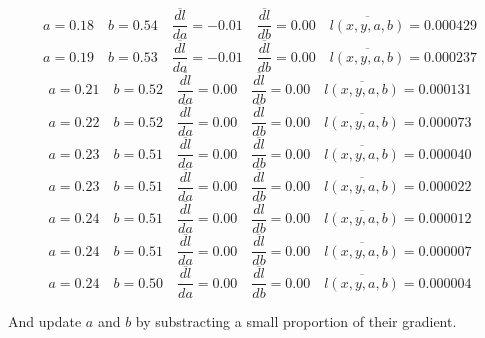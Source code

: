 \documentclass[9pt]{beamer}
\begin{document}
\begin{frame}
\begin{overprint}
     \[ a = 0.18 \quad b = 0.54 \quad \overline{\frac{dl}{da}} = -0.01 \quad \overline{\frac{dl}{db}} = 0.00 \quad \overline{l(x, y, a, b)} = 0.000429 \]
     \[ a = 0.19 \quad b = 0.53 \quad \overline{\frac{dl}{da}} = -0.01 \quad \overline{\frac{dl}{db}} = 0.00 \quad \overline{l(x, y, a, b)} = 0.000237 \]
     \[ a = 0.21 \quad b = 0.52 \quad \overline{\frac{dl}{da}} = 0.00 \quad \overline{\frac{dl}{db}} = 0.00 \quad \overline{l(x, y, a, b)} = 0.000131 \]
     \[ a = 0.22 \quad b = 0.52 \quad \overline{\frac{dl}{da}} = 0.00 \quad \overline{\frac{dl}{db}} = 0.00 \quad \overline{l(x, y, a, b)} = 0.000073 \]
     \[ a = 0.23 \quad b = 0.51 \quad \overline{\frac{dl}{da}} = 0.00 \quad \overline{\frac{dl}{db}} = 0.00 \quad \overline{l(x, y, a, b)} = 0.000040 \]
     \[ a = 0.23 \quad b = 0.51 \quad \overline{\frac{dl}{da}} = 0.00 \quad \overline{\frac{dl}{db}} = 0.00 \quad \overline{l(x, y, a, b)} = 0.000022 \]
     \[ a = 0.24 \quad b = 0.51 \quad \overline{\frac{dl}{da}} = 0.00 \quad \overline{\frac{dl}{db}} = 0.00 \quad \overline{l(x, y, a, b)} = 0.000012 \]
     \[ a = 0.24 \quad b = 0.51 \quad \overline{\frac{dl}{da}} = 0.00 \quad \overline{\frac{dl}{db}} = 0.00 \quad \overline{l(x, y, a, b)} = 0.000007 \]
     \[ a = 0.24 \quad b = 0.50 \quad \overline{\frac{dl}{da}} = 0.00 \quad \overline{\frac{dl}{db}} = 0.00 \quad \overline{l(x, y, a, b)} = 0.000004 \]
  \end{overprint}

  \bigskip

  And update $a$ and $b$ by substracting a small proportion of their
  gradient.

\end{frame}
\end{document}
